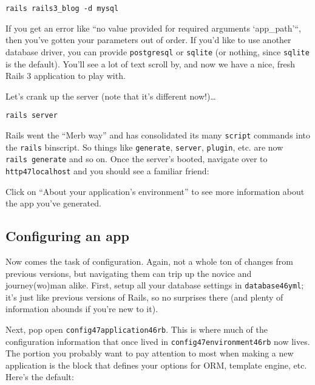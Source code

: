 \documentclass{book}
\begin{document}
\begin{verbatim}rails rails3_blog -d mysql\end{verbatim}
If you get an error like ``{}no value provided for required arguments `{}app\_path'{}``{}, then you'{}ve gotten your parameters out of order. If you'{}d like to use another database driver, you can provide {\colorbox[rgb]{0.87,0.87,0.87}{\tt postgresql}} or {\colorbox[rgb]{0.87,0.87,0.87}{\tt sqlite}} (or nothing, since {\colorbox[rgb]{0.87,0.87,0.87}{\tt sqlite}} is the default). You'{}ll see a lot of text scroll by, and now we have a nice, fresh Rails 3 application to play with.

Let'{}s crank up the server (note that it'{}s different now!)\ldots{}

\begin{verbatim}rails server\end{verbatim}
Rails went the ``{}Merb way''{} and has consolidated its many {\colorbox[rgb]{0.87,0.87,0.87}{\tt script}} commands into the {\colorbox[rgb]{0.87,0.87,0.87}{\tt rails}} binscript. So things like {\colorbox[rgb]{0.87,0.87,0.87}{\tt generate}}, {\colorbox[rgb]{0.87,0.87,0.87}{\tt server}}, {\colorbox[rgb]{0.87,0.87,0.87}{\tt plugin}}, etc. are now {\colorbox[rgb]{0.87,0.87,0.87}{\tt rails~generate}} and so on. Once the server'{}s booted, navigate over to {\colorbox[rgb]{0.87,0.87,0.87}{\tt http\char47localhost}} and you should see a familiar friend:



Click on ``{}About your application'{}s environment''{} to see more information about the app you'{}ve generated.

\hypertarget{configuring_an_app}{}\subsection*{{Configuring an app}}\label{configuring_an_app}

Now comes the task of configuration. Again, not a whole ton of changes from previous versions, but navigating them can trip up the novice and journey(wo)man alike. First, setup all your database settings in {\colorbox[rgb]{0.87,0.87,0.87}{\tt database\char46yml}}; it'{}s just like previous versions of Rails, so no surprises there (and plenty of information abounds if you'{}re new to it).

Next, pop open {\colorbox[rgb]{0.87,0.87,0.87}{\tt config\char47application\char46rb}}. This is where much of the configuration information that once lived in {\colorbox[rgb]{0.87,0.87,0.87}{\tt config\char47environment\char46rb}} now lives. The portion you probably want to pay attention to most when making a new application is the block that defines your options for ORM, template engine, etc. Here'{}s the default:
\end{document}
